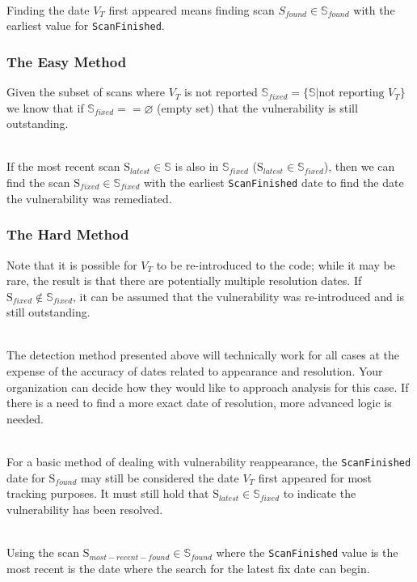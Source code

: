 \noindent\\Finding the date $V_T$ first appeared means finding scan
$S_{found}\in\mathbb{S}_{found}$
with the earliest value for \texttt{ScanFinished}.

\subsubsection{The Easy Method}

Given the subset of scans where $V_T$ is not reported 
$\mathbb{S}_{fixed}= \{\mathbb{S} | \text{not reporting }V_T\}$ 
we know that if $\mathbb{S}_{fixed} == \varnothing$ (empty set) that the vulnerability is still outstanding.  

\noindent\\If the most recent scan $\text{S}_{latest}\in\mathbb{S}$ is also in $\mathbb{S}_{fixed}$ ($\text{S}_{latest}\in\mathbb{S}_{fixed}$), then we can find the scan
$\text{S}_{fixed}\in\mathbb{S}_{fixed}$ with the earliest \texttt{ScanFinished} date to find the date
the vulnerability was remediated.

\subsubsection{The Hard Method}

Note that it is possible for $V_T$ to be re-introduced to the code; while it may be rare, the result is that there are potentially multiple 
resolution dates. If $\text{S}_{fixed}\notin\mathbb{S}_{fixed}$, it can be assumed that the vulnerability was re-introduced and is still outstanding. 

\noindent\\The detection method presented above will technically work for all cases at the expense of the accuracy of dates related to appearance and resolution.  Your organization
can decide how they would like to approach analysis for this case.  If there is a need to find a more exact date of resolution, more advanced logic is needed.

\noindent\\For a basic method of dealing with vulnerability reappearance, the \texttt{ScanFinished} date for 
$\text{S}_{found}$ may still be considered the date $V_T$ first appeared for most tracking purposes. It must still hold 
that $\text{S}_{latest}\in\mathbb{S}_{fixed}$ to indicate the vulnerability has been resolved.

\noindent\\Using the scan $\text{S}_{most-recent-found}\in\mathbb{S}_{found}$ where the \texttt{ScanFinished} value is the most recent is the date where the search for
the latest fix date can begin.

